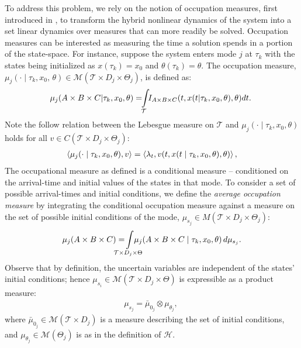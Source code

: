 To address this problem, we rely on the notion of occupation measures, first introduced in \cite{Pitman1977}, to transform the hybrid nonlinear dynamics of the system into a set linear dynamics over measures that can more readily be solved.
Occupation measures can be interested as measuring the time a solution spends in a portion of the state-space. 
For instance, suppose the system enters mode $j$ at $\tau_k$ with the states being initialized as $x(\tau_k)=x_0$ and $\theta(\tau_k)=\theta$.
The occupation measure, \mbox{$\mu_j(\cdot\mid \tau_k,x_0,\,\theta)\in \mathcal M(\mathcal T\times D_j\times \Theta_j)$}, is defined as:
\small
\begin{align}
\hspace*{-1mm}\mu_j(A\times B\times C| \tau_k ,x_0,\theta)=\hspace*{-1.25mm}\int\limits_{\cal T} \hspace*{-1.25mm} I_{A\times B\times C}(t,x(t|\tau_k,x_0,\theta),\theta)dt.
\end{align}
\normalsize
Note the follow relation between the Lebesgue measure on $\mathcal T$ and $\mu_j(\cdot\mid \tau_k,x_0,\theta)$ holds for all $v \in C(\mathcal T\times D_j\times \Theta_j)$:
\begin{align}
\left\langle \mu_j(\cdot\mid \tau_k,x_0,\theta),v\right\rangle=\left\langle \lambda_t,v(t,x(t\mid \tau_k,x_0,\theta),\theta)\right\rangle,
\label{eq:mu_lambda}
\end{align}
The occupational measure as defined is a conditional measure -- conditioned on the arrival-time and initial values of the states in that mode.
To consider a set of possible arrival-times and initial conditions, we define the \emph{average occupation measure} by integrating the conditional occupation measure against a measure on the set of possible initial conditions of the mode, $\mu_{s_j} \in  M(\mathcal T\times D_j\times \Theta_j)$:
\begin{align}
\mu_j(A\times B\times C)= \hspace*{-5mm}\int\limits_{\mathcal T\times D_j\times \Theta}\hspace*{-5mm}\mu_j(A\times B\times C\mid \tau_k,x_0,\theta)\,d \mu_{s_j}.
\label{eq:mu_avg}
\end{align}
Observe that by definition, the uncertain variables are independent of the states' initial conditions; hence $\mu_{s_i}\in \mathcal M(\mathcal T\times D_j\times \Theta)$ is expressible as a product measure:
\begin{align}
\mu_{s_j}=\bar\mu_{0_j}\otimes \mu_{\theta_j},\
\end{align}
where $\bar \mu_{0_j}\in \mathcal M(\mathcal T\times D_j)$ is a measure describing the set of initial conditions, and $\mu_{\theta_j}\in \mathcal M(\Theta_j)$ is as in the definition of $\mathcal H$.

